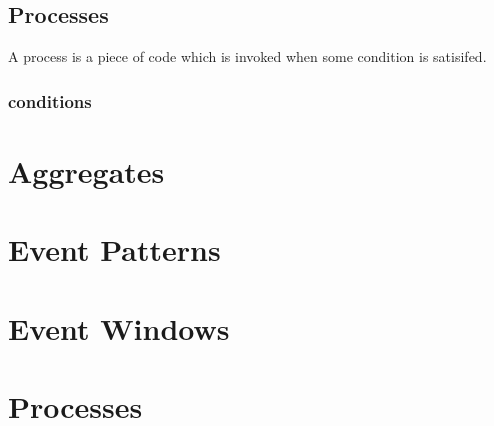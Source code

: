 \documentclass[twocolumn]{report}
\begin{document}
\section{Processes}
A process is a piece of code which is invoked when some condition is
satisifed. 

\subsection{conditions}


\chapter{Aggregates}

\chapter{Event Patterns}
\chapter{Event Windows}

\chapter{Processes}




\nocite{EN11}
\end{document}
